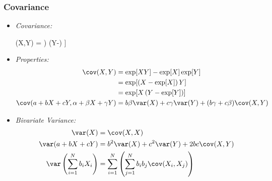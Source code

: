 

\begin{frame}
\frametitle{Covariance}
\begin{itemize}
\item \emph{Covariance:}
\begin{emphalign*}
\cov(X,Y) 
  = \exp\left[\left(X-\exp[X] \right) \left(Y-\exp[Y] \right) \right]
\end{emphalign*}
\item \emph{Properties:}
\begin{align*}
\cov(X,Y) 
  & = \exp[X Y]-\exp[X] \exp[Y]\\
  & = \exp[\left(X-\exp[X]\right)Y]\\
  & = \exp[X\left(Y-\exp[Y]\right)]\\
\cov(a + b X + c Y, \alpha + \beta X + \gamma Y) 
  & = b \beta \var(X) + c \gamma \var(Y) + (b \gamma + c \beta ) \cov(X, Y)
\end{align*}
\item \emph{Bivariate Variance:}
\begin{align*}
\var(X) 
  & = \cov(X,X) \\
\var(a + bX + cY) 
  & =  b^2 \var(X) + c^2\var(Y) + 2bc \cov(X,Y)\\
\var\left(\sum_{i=1}^N b_i X_i \right) 
  & = \sum_{i=1}^N \left(\sum_{j=1}^N b_i b_j \cov(X_i,X_j) \right)
\end{align*}
\end{itemize}
\end{frame}

